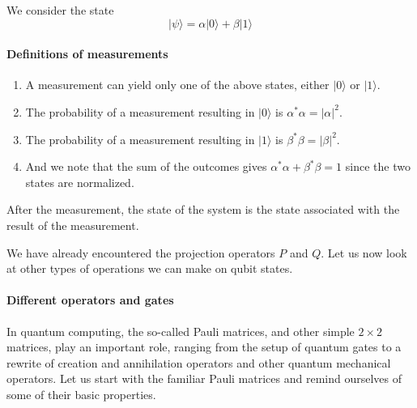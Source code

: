 We  consider the state
\[
\vert \psi\rangle = \alpha \vert 0 \rangle +\beta \vert 1 \rangle
\]


\paragraph{Definitions of measurements}

\begin{enumerate}
\item A measurement can yield only one of the above states, either $\vert 0\rangle$ or $\vert 1\rangle$.

\item The probability of a measurement resulting in $\vert 0\rangle$ is $\alpha^*\alpha = \vert \alpha \vert^2$.

\item The probability of a measurement resulting in $\vert 1\rangle$ is $\beta^*\beta = \vert \beta \vert^2$.

\item And we note that the sum of the outcomes gives $\alpha^*\alpha+\beta^*\beta=1$ since the two states are normalized.
\end{enumerate}


After the measurement, the state of the system is the state associated with the result of the measurement.

We have already encountered the projection operators $P$ and $Q$. Let
us now look at other types of operations we can make on qubit states.


\paragraph{Different operators and gates}

In quantum computing, the so-called Pauli matrices, and other simple
$2\times 2$ matrices, play an important role, ranging from the setup
of quantum gates to a rewrite of creation and annihilation operators
and other quantum mechanical operators. Let us start with the familiar
Pauli matrices and remind ourselves of some of their basic properties.

